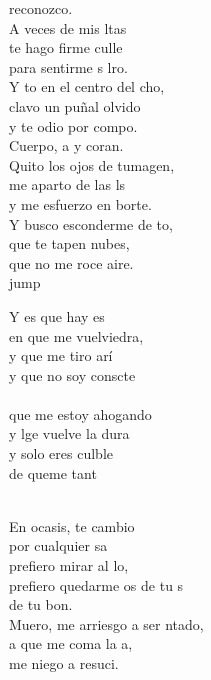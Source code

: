 \begin{cancion}[Culpable][Ixcís]%
	reconozco. \\
	A veces de mis ltas \\
	te hago firme culle \\
	para sentirme s lro. \\
	Y to en el centro del cho,\\
	clavo un puñal olvido \\
	y te odio por compo. \\
	Cuerpo, a y coran. \\
	Quito los ojos de tumagen, \\
	me aparto de las ls \\
	y me esfuerzo en borte. \\
	Y busco esconderme de to,  \\
	que te tapen  nubes,  \\
	que no me roce aire. \\jump\\
	\begin{chorus}%
	Y es que hay es \\
	en que me vuelviedra, \\
	y que me tiro arí\\
	y que no soy conscte \\
	\jump\\
que me estoy ahogando \\
	y lge vuelve la dura \\
	y solo eres culble \\
	de queme tant\\
	\end{chorus}%
	\jump\\
	En ocasis, te cambio\\
	por cualquier sa\\
	prefiero mirar al lo, \\
	prefiero quedarme os de tu s \\
	de tu bon. \\
	Muero, me arriesgo a ser ntado, \\
	a que me coma la a, \\
	me niego a resuci.  \\
\end{cancion}%
